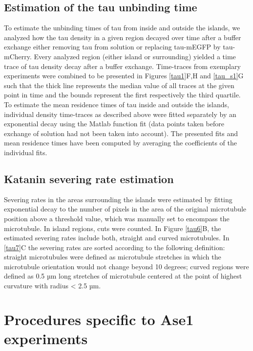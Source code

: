 \subsection{Estimation of the tau unbinding time}
To estimate the unbinding times of tau from inside and outside the islands, we analyzed how the tau density in a given region decayed over time after a buffer exchange either removing tau from solution or replacing tau-mEGFP by tau-mCherry. Every analyzed region (either island or surrounding) yielded a time trace of tau density decay after a buffer exchange. Time-traces from exemplary experiments were combined to be presented in Figures \ref{tau1}F,H and \ref{tau_s1}G  such that the thick line represents the median value of all traces at the given point in time and the bounds represent the first respectively the third quartile. To estimate the mean residence times of tau inside and outside the islands, individual density time-traces as described above were fitted separately by an exponential decay using the Matlab function fit (data points taken before exchange of solution had not been taken into account). The presented fits and mean residence times have been computed by averaging the coefficients of the individual fits.

\subsection{Katanin severing rate estimation} 
Severing rates in the areas surrounding the islands were estimated by fitting exponential decay to the number of pixels in the area of the original microtubule position above a threshold value, which was manually set to encompass the microtubule. In island regions, cuts were counted. In Figure \ref{tau6}B, the estimated severing rates include both, straight and curved microtubules. In \ref{tau7}C the severing rates are sorted according to the following definition: straight microtubules were defined as microtubule stretches in which the microtubule orientation would not change beyond 10 degrees; curved regions were defined as 0.5 µm long stretches of microtubule centered at the point of highest curvature with radius < 2.5 µm.

\section{Procedures specific to Ase1 experiments}
